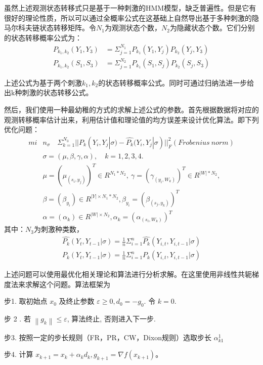 虽然上述观测状态转移式只是基于一种刺激的HMM模型，缺乏普遍性。但是它有很好的理论性质，所以可以通过全概率公式在这基础上自然导出基于多种刺激的隐马尔科夫链状态转移矩阵。令$N_1$为观测状态个数，$N_2$为隐藏状态个数。它们分别的状态转移概率公式为：
$$\begin{aligned}
P_{k_1,k_2}(Y_1,Y_3) &= \Sigma_{j=1}^{N_1}P_{k_1 }(Y_1,Y_j)P_{ k_2}(Y_j,Y_3)\\
P_{k_1,k_2}(S_1,S_3) &= \Sigma_{j=1}^{N_2}P_{k_1}(S_1,S_j)P_{k_2}(S_j,S_3)
\end{aligned}$$

上述公式为基于两个刺激${k_1,k_2}$的状态转移概率公式。同时可通过归纳法进一步给出k种刺激的状态转移公式。

然后，我们使用一种最幼稚的方式的求解上述公式的参数。首先根据数据将对应的观测转移概率估计出来，利用估计值和理论值的均方误差来设计优化算法。即下列优化问题：
$$\begin{aligned}
mi&n_{\sigma} \quad \Sigma_{k=1}^{N_3}||P_k(Y_{i},Y_{j} | \sigma) - \hat{P_k}(Y_{i},Y_{j} | \sigma)||_F^2(Frobenius \ norm)\\
&\sigma = (\mu,\beta,\gamma,\alpha),\quad k = 1,2,3,4.\\
&\mu=(\mu_{(s_i,y_j)})^T\in R^{N_1*N_2},\ \gamma=(\gamma_{(y_i,W_k)})^T \in R^{|W|* N_2},\\
&\beta=(\beta_{y_i}) \in R^{|Y|\times N_1*N_2},\beta_{y_i} = (\beta_{(s_{j},y_{k})})^T\\
&\alpha=(\alpha_{k}) \in R^{|W|\times N_2},\alpha_k = (\alpha_{(s_i,W_k)})^T
\end{aligned}$$
其中：$N_3$为刺激种类数，
$$\begin{aligned}
\hat{P_k}(Y_{t},Y_{t-1} | \sigma) = \frac{1}{n}\Sigma_{i=1}^{n}\hat{P_k}(Y_{i,t},Y_{i,t-1} | \sigma)\\
{P_k}(Y_{t},Y_{t-1} | \sigma) = \frac{1}{n}\Sigma_{i=1}^{n}{P_k}(Y_{i,t},Y_{i,t-1} | \sigma)
\end{aligned}$$

上述问题可以使用最优化相关理论和算法进行分析求解。在这里使用非线性共轭梯度法来求解这个问题。算法框架为

步1. 取初始点 $x_{0}$ 及终止参数 $\varepsilon \geq 0, d_{0}=-g_{0}$. 令 $k=0$.

步 2 . 若 $\left\|g_{k}\right\| \leq \varepsilon$, 算法终止, 否则进入下一步.

步3. 按照一定的步长规则（FR，PR，CW，Dixon规则）选取步长 $\alpha_{k 1}^{1}$ 

步4. 计算 $x_{k+1}=x_{k}+\alpha_{k} d_{k}, g_{k+1}=\nabla f\left(x_{k+1}\right)$。


